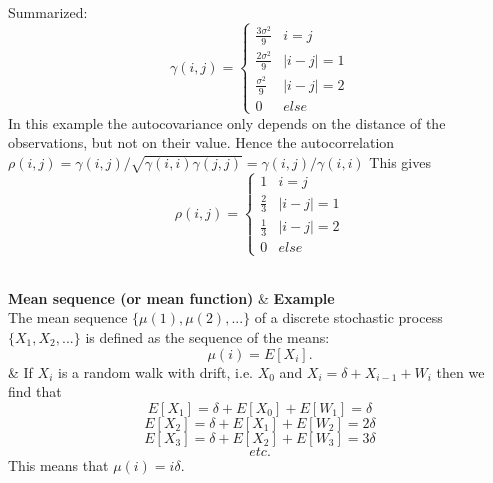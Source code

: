 {\begin{twoColTable}
	Summarized:\vfill
	$$ \gamma(i,j)=
	\begin{cases}
	\frac{3\sigma^2}{9} & i=j\\
	\frac{2\sigma^2}{9} & |i-j|=1\\
	\frac{\sigma^2}{9} & |i-j|=2\\
	0					& else
	\end{cases}
	$$
	In this example the autocovariance only depends on the distance of the observations, but not on their value. Hence the autocorrelation $\rho(i,j)=\gamma(i,j)/\sqrt{\gamma(i,i)\gamma(j,j)}=\gamma(i,j)/\gamma(i,i)$
	This gives\vfill
	$$ \rho(i,j)=
	\begin{cases}
	1 & i=j\\
	\frac{2}{3} & |i-j|=1\\
	\frac{1}{3} & |i-j|=2\\
	0					& else
	\end{cases}
	$$
	\\
	\hline
\end{twoColTable}
\begin{twoColTable}
	\hline
	\textbf{Mean sequence (or mean function)}
	& \textbf{Example}\\
	\hline
	The mean sequence $\{\mu(1),\mu(2),...\}$ of a discrete stochastic process $\{X_1,X_2,...\}$ is defined as the sequence of the means: 
	$$\mu(i) = E[X_i].$$
	& 
	If $X_i$ is a random walk with drift, i.e. $X_0$ and $X_i =\delta + X_{i-1} +W_i$ then we find that 
	$$E[X_1]=\delta + E[X_0] + E[W_1] = \delta$$
	$$E[X_2]=\delta + E[X_1] + E[W_2] = 2\delta$$
	$$E[X_3]=\delta + E[X_2] + E[W_3] = 3\delta$$
	$$etc.$$
	This means that $\mu(i) = i\delta$.
	\\
	\hline

\end{twoColTable}
}
